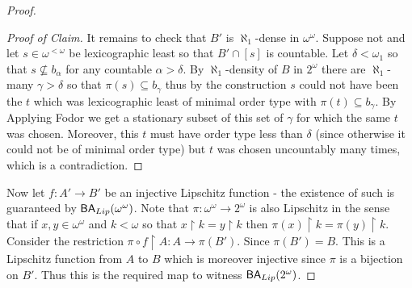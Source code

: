 \documentclass[10pt,a4paper]{amsart}
\def\BA{\mathsf{BA}}
\def\baire{\omega^\omega}
\def\cantor{2^\omega}
\def\hook{\upharpoonright}
\begin{document}
\begin{proof}
\begin{proof}[Proof of Claim]
        It remains to check that $B'$ is $\aleph_1$-dense in $\baire$. Suppose not and let $s \in \omega^{<\omega}$ be lexicographic least so that $B' \cap [s]$ is countable. Let $\delta < \omega_1$ so that $s \nsubseteq b_\alpha$ for any countable $\alpha > \delta$. By $\aleph_1$-density of $B$ in $2^\omega$ there are $\aleph_1$-many $\gamma > \delta$ so that $\pi (s) \subseteq b_\gamma$ thus by the construction $s$ could not have been the $t$ which was lexicographic least of minimal order type with $\pi (t) \subseteq b_\gamma$. By Applying Fodor we get a stationary subset of this set of $\gamma$ for which the same $t$ was chosen. Moreover, this $t$ must have order type less than $\delta$ (since otherwise it could not be of minimal order type) but $t$ was chosen uncountably many times, which is a contradiction. 
        
        
    \end{proof}

    Now let $f:A' \to B'$ be an injective Lipschitz function - the existence of such is guaranteed by $\BA_{\rm Lip}(\baire)$. Note that $\pi:\baire \to \cantor$ is also Lipschitz in the sense that if $x, y \in \baire$ and $k < \omega$ so that $x \hook k = y \hook k$ then $\pi (x) \hook k = \pi (y) \hook k$. Consider the restriction $\pi \circ f \hook A: A \to \pi (B')$. Since $\pi (B') = B$. This is a Lipschitz function from $A$ to $B$ which is moreover injective since $\pi$ is a bijection on $B'$. Thus this is the required map to witness $\BA_{\rm Lip}(2^\omega)$. 
\end{proof}
\end{document}
